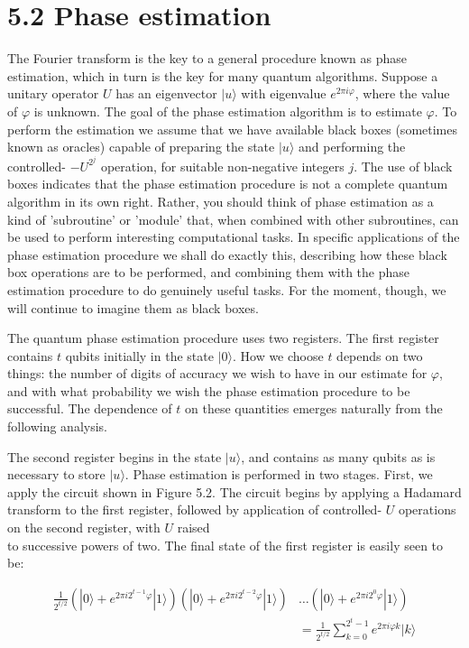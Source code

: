 \section*{5.2 Phase estimation}

The Fourier transform is the key to a general procedure known as phase estimation, which in turn is the key for many quantum algorithms. Suppose a unitary operator $U$ has an eigenvector $|u\rangle$ with eigenvalue $e^{2 \pi i \varphi}$, where the value of $\varphi$ is unknown. The goal of the phase estimation algorithm is to estimate $\varphi$. To perform the estimation we assume that we have available black boxes (sometimes known as oracles) capable of preparing the state $|u\rangle$ and performing the controlled- $-U^{2^{j}}$ operation, for suitable non-negative integers $j$. The use of black boxes indicates that the phase estimation procedure is not a complete quantum algorithm in its own right. Rather, you should think of phase estimation as a kind of 'subroutine' or 'module' that, when combined with other subroutines, can be used to perform interesting computational tasks. In specific applications of the phase estimation procedure we shall do exactly this, describing how these black box operations are to be performed, and combining them with the phase estimation procedure to do genuinely useful tasks. For the moment, though, we will continue to imagine them as black boxes.

The quantum phase estimation procedure uses two registers. The first register contains $t$ qubits initially in the state $|0\rangle$. How we choose $t$ depends on two things: the number of digits of accuracy we wish to have in our estimate for $\varphi$, and with what probability we wish the phase estimation procedure to be successful. The dependence of $t$ on these quantities emerges naturally from the following analysis.

The second register begins in the state $|u\rangle$, and contains as many qubits as is necessary to store $|u\rangle$. Phase estimation is performed in two stages. First, we apply the circuit shown in Figure 5.2. The circuit begins by applying a Hadamard transform to the first register, followed by application of controlled- $U$ operations on the second register, with $U$ raised\\
to successive powers of two. The final state of the first register is easily seen to be:


\begin{align*}
\frac{1}{2^{t / 2}}\left(|0\rangle+e^{2 \pi i 2^{t-1} \varphi}|1\rangle\right)\left(|0\rangle+e^{2 \pi i 2^{t-2} \varphi}|1\rangle\right) & \ldots\left(|0\rangle+e^{2 \pi i 2^{0} \varphi}|1\rangle\right) \\
& =\frac{1}{2^{t / 2}} \sum_{k=0}^{2^{t}-1} e^{2 \pi i \varphi k}|k\rangle \tag{5.20}
\end{align*} 

